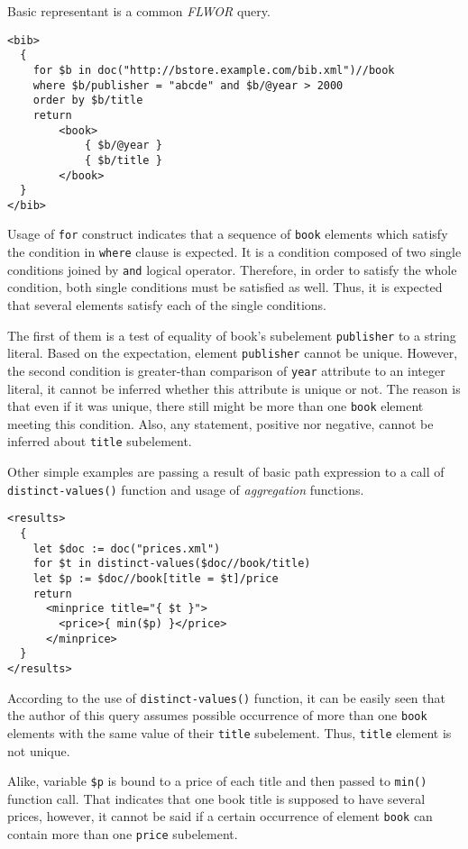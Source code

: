 Basic representant is a common \emph{FLWOR} query.

\begin{verbatim}
<bib>
  {
    for $b in doc("http://bstore.example.com/bib.xml")//book
    where $b/publisher = "abcde" and $b/@year > 2000
    order by $b/title
    return
        <book>
            { $b/@year }
            { $b/title }
        </book>
  }
</bib>
\end{verbatim}

Usage of \texttt{for} construct indicates that a sequence of \texttt{book} elements which satisfy the condition in \texttt{where} clause is expected. It is a condition composed of two single conditions joined by \texttt{and} logical operator. Therefore, in order to satisfy the whole condition, both single conditions must be satisfied as well. Thus, it is expected that several elements satisfy each of the single conditions.

The first of them is a test of equality of book's subelement \texttt{publisher} to a string literal. Based on the expectation, element \texttt{publisher} cannot be unique. However, the second condition is greater-than comparison of \texttt{year} attribute to an integer literal, it cannot be inferred whether this attribute is unique or not. The reason is that even if it was unique, there still might be more than one \texttt{book} element meeting this condition. Also, any statement, positive nor negative, cannot be inferred about \texttt{title} subelement.

Other simple examples are passing a result of basic path expression to a call of \texttt{distinct-values()} function and usage of \emph{aggregation} functions.

\begin{verbatim}
<results>
  {
    let $doc := doc("prices.xml")
    for $t in distinct-values($doc//book/title)
    let $p := $doc//book[title = $t]/price
    return
      <minprice title="{ $t }">
        <price>{ min($p) }</price>
      </minprice>
  }
</results>
\end{verbatim}

According to the use of \texttt{distinct-values()} function, it can be easily seen that the author of this query assumes possible occurrence of more than one \texttt{book} elements with the same value of their \texttt{title} subelement. Thus, \texttt{title} element is not unique.

Alike, variable \texttt{\$p} is bound to a price of each title and then passed to \texttt{min()} function call. That indicates that one book title is supposed to have several prices, however, it cannot be said if a certain occurrence of element \texttt{book} can contain more than one \texttt{price} subelement.

